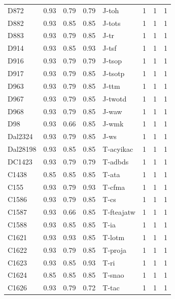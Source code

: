 \documentclass[a4paper,10pt,twoside,fleqn]{article}
\begin{document}
\begin{table}
\begin{tabular}{lrrrlrrr}
D872     & 0.93 & 0.79 & 0.79 &      J-toh    &    1    &    1    &    1   \\
D882     & 0.93 & 0.85 & 0.85 &     J-tots    &    1    &    1    &    1   \\
D883     & 0.93 & 0.79 & 0.85 &       J-tr    &    1    &    1    &    1   \\
D914     & 0.93 & 0.85 & 0.93 &      J-tsf    &    1    &    1    &    1   \\
D916     & 0.93 & 0.79 & 0.79 &     J-tsop    &    1    &    1    &    1   \\
D917     & 0.93 & 0.79 & 0.85 &    J-tsotp    &    1    &    1    &    1   \\
D963     & 0.93 & 0.79 & 0.85 &      J-ttm    &    1    &    1    &    1   \\
D967     & 0.93 & 0.79 & 0.85 &    J-twotd    &    1    &    1    &    1   \\
D968     & 0.93 & 0.79 & 0.85 &      J-waw    &    1    &    1    &    1   \\
D98      & 0.93 & 0.66 & 0.85 &      J-wmk    &    1    &    1    &    1   \\
Dal2324  & 0.93 & 0.79 & 0.85 &       J-ws    &    1    &    1    &    1   \\
Dal28198 & 0.93 & 0.85 & 0.85 &  T-acyikac    &    1    &    1    &    1   \\
DC1423   & 0.93 & 0.79 & 0.79 &    T-adbds    &    1    &    1    &    1   \\
C1438    & 0.85 & 0.85 & 0.85 &      T-ata    &    1    &    1    &    1   \\
C155     & 0.93 & 0.79 & 0.93 &     T-cfma    &    1    &    1    &    1   \\
C1586    & 0.93 & 0.79 & 0.85 &       T-cs    &    1    &    1    &    1   \\
C1587    & 0.93 & 0.66 & 0.85 & T-fteajatw    &    1    &    1    &    1   \\
C1588    & 0.93 & 0.85 & 0.85 &       T-ia    &    1    &    1    &    1   \\
C1621    & 0.93 & 0.93 & 0.85 &     T-lotm    &    1    &    1    &    1   \\
C1622    & 0.93 & 0.79 & 0.85 &    T-proja    &    1    &    1    &    1   \\
C1623    & 0.93 & 0.85 & 0.93 &       T-ri    &    1    &    1    &    1   \\
C1624    & 0.85 & 0.85 & 0.85 &     T-snao    &    1    &    1    &    1   \\
C1626    & 0.93 & 0.79 & 0.72 &      T-tac    &    1    &    1    &    1   \\

\end{tabular}
\end{table}
\end{document}
